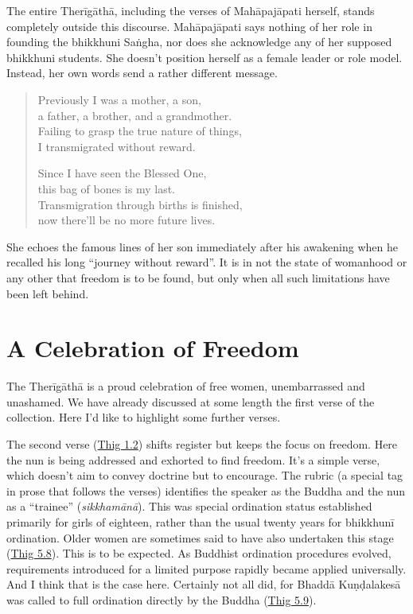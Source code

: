 \documentclass[12pt,openany]{book}%
\begin{document}
The entire \textsanskrit{Therīgāthā}, including the verses of \textsanskrit{Mahāpajāpati} herself, stands completely outside this discourse. \textsanskrit{Mahāpajāpati} says nothing of her role in founding the bhikkhuni \textsanskrit{Saṅgha}, nor does she acknowledge any of her supposed bhikkhuni students. She doesn’t position herself as a female leader or role model. Instead, her own words send a rather different message.

\begin{verse}%
Previously I was a mother, a son, \\
a father, a brother, and a grandmother. \\
Failing to grasp the true nature of things, \\
I transmigrated without reward.

Since I have seen the Blessed One, \\
this bag of bones is my last. \\
Transmigration through births is finished, \\
now there’ll be no more future lives.

%
\end{verse}

She echoes the famous lines of her son immediately after his awakening when he recalled his long “journey without reward”. It is in not the state of womanhood or any other that freedom is to be found, but only when all such limitations have been left behind.

\section*{A Celebration of Freedom}

The \textsanskrit{Therīgāthā} is a proud celebration of free women, unembarrassed and unashamed. We have already discussed at some length the first verse of the collection. Here I’d like to highlight some further verses.

The second verse (\href{https://suttacentral.net/thig1.2}{Thig 1.2}) shifts register but keeps the focus on freedom. Here the nun is being addressed and exhorted to find freedom. It’s a simple verse, which doesn’t aim to convey doctrine but to encourage. The rubric (a special tag in prose that follows the verses) identifies the speaker as the Buddha and the nun as a “trainee” (\textit{\textsanskrit{sikkhamānā}}). This was special ordination status established primarily for girls of eighteen, rather than the usual twenty years for \textsanskrit{bhikkhunī} ordination. Older women are sometimes said to have also undertaken this stage (\href{https://suttacentral.net/thig5.8}{Thig 5.8}). This is to be expected. As Buddhist ordination procedures evolved, requirements introduced for a limited purpose rapidly became applied universally. And I think that is the case here. Certainly not all did, for \textsanskrit{Bhaddā} \textsanskrit{Kuṇḍalakesā} was called to full ordination directly by the Buddha (\href{https://suttacentral.net/thig5.9}{Thig 5.9}).
\end{document}
